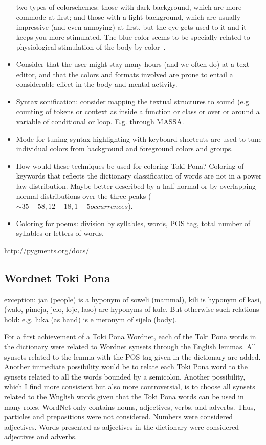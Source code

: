 \documentclass{article}
\begin{document}
\begin{itemize}
  two types of colorschemes: those with dark background,
  which are more commode at first; and those with a light background,
  which are usually impressive (and even annoying) at first,
  but the eye gets used to it and it keeps you more stimulated.
  The blue color seems to be specially related to physiological
  stimulation of the body by color~\cite{blue,blue}.
  \item Consider that the user might stay many hours (and we often do)
  at a text editor, and that the colors and formats involved are
  prone to entail a considerable effect in the body and mental
  activity.
  \item Syntax sonification: consider mapping the textual structures
  to sound (e.g. counting of tokens or context as inside a function or
  class or over or around a variable of conditional or loop.
  E.g. through MASSA.
  \item Mode for tuning syntax highlighting with keyboard shortcuts
  are used to tune individual colors from background and foreground
  colors and groups.
  \item How would these techniques be used for coloring Toki Pona?
  Coloring of keywords that reflects the dictionary classification
  of words are not in a power law distribution.
  Maybe better described by a half-normal or by
  overlapping normal distributions over the three peaks ($\sim35-58,
  12-18, 1-5 occurrences$).
  \item Coloring for poems: division by syllables, words, POS tag,
    total number of syllables or letters of words.
\end{itemize}

\url{http://pygments.org/docs/}

\subsection{Wordnet Toki Pona}\label{wn}
exception: jan (people)
is a hyponym of soweli (mammal),
kili is hyponym of kasi,
(walo, pimeja, jelo, loje, laso) are hyponyms of kule.
But otherwise such relations hold:
e.g. luka (as hand) is e meronym of sijelo (body).

For a first achievement of a Toki Pona Wordnet,
each of the Toki Pona words in the dictionary
were related to Wordnet synsets
through the English lemmas.
All synsets related to the lemma with the POS tag
given in the dictionary are added.
Another immediate possibility would be to
relate each Toki Pona word to the synsets
related to all the words bounded by a semicolon.
Another possibility, which I find more consistent
but also more controversial,
is to choose all synsets related to the Wnglish
words given that the Toki Pona words can be used
in many roles.
WordNet only contains nouns, adjectives, verbs, and adverbs.
Thus, particles and prepositions were not considered.
Numbers were considered adjectives.
Words presented as adjectives in the dictionary
were considered adjectives and adverbs.
\end{document}
